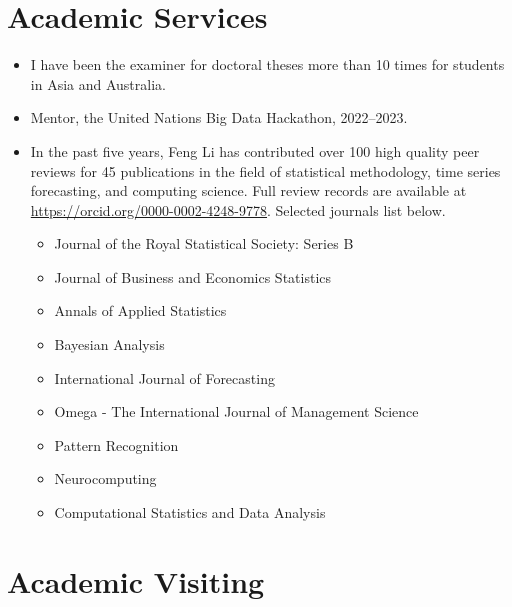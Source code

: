 \documentclass[twoside,a4paper]{article}
\begin{document}
\section{Academic Services}

\begin{itemize}

\item I have been the examiner for doctoral theses more than 10 times for students in Asia and Australia.
\item Mentor, the United Nations Big Data Hackathon, 2022--2023.
\item In the past five years, Feng Li has contributed over 100 high quality peer reviews for 45 publications in the field of statistical methodology, time series forecasting, and computing science. Full review records are available at \url{https://orcid.org/0000-0002-4248-9778}. Selected journals list below.

  \begin{itemize}
  \item Journal of the Royal Statistical Society: Series B
  \item Journal of Business and Economics Statistics
  \item Annals of Applied Statistics
  \item Bayesian Analysis
  \item International Journal of Forecasting
  \item Omega - The International Journal of Management Science
  \item Pattern Recognition
  \item Neurocomputing
  \item Computational Statistics and Data Analysis
  \end{itemize}
\end{itemize}


\section{Academic Visiting}
\end{document}
